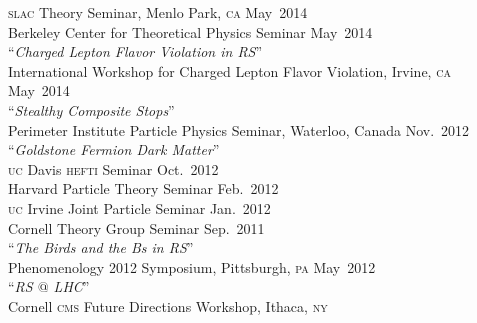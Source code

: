 \documentclass[margin,line]{resume}
\newcommand{\mytalksep}{-.1mm}
\newcommand{\mytalkskip}{2mm}
\newcommand{\scap}[1]{\textsc{\MakeLowercase{#1}}}
\begin{document}
\begin{resume}
%
\scap{SLAC} Theory Seminar, Menlo Park, \scap{CA}
\hfill %
May~2014\vspace{\mytalksep}\\   
%
Berkeley Center for Theoretical Physics Seminar%
\hfill %
May~2014\vspace{\mytalkskip}\\
%
%
%
``\emph{Charged Lepton Flavor Violation in RS}'' 
\vspace{\mytalksep}\\ 
International Workshop for Charged Lepton Flavor Violation, Irvine, \scap{CA}
\hfill %
May~2014\vspace{\mytalkskip}\\ 
%
%
%
``\emph{Stealthy Composite Stops}''
\vspace{\mytalksep}\\   
Perimeter Institute Particle Physics Seminar, Waterloo, Canada
\hfill %
Nov.~2012%
\vspace{\mytalkskip}\\
%
%
%
``\emph{Goldstone Fermion Dark Matter}''
\vspace{\mytalksep}\\   
\scap{UC} Davis \scap{HEFTI} Seminar
\hfill %
Oct.~2012\vspace{\mytalksep}\\   
%
Harvard Particle Theory Seminar%
\hfill %
Feb.~2012\vspace{\mytalksep}\\   
%
\scap{UC} Irvine Joint Particle Seminar
\hfill %
Jan.~2012\vspace{\mytalksep}\\   
%
Cornell Theory Group Seminar
\hfill %
Sep.~2011%
\vspace{\mytalkskip}\\
%
%
%
``\emph{The Birds and the Bs in RS}'' 
\vspace{\mytalksep}\\ 
Phenomenology 2012 Symposium, Pittsburgh, \scap{PA}
\hfill %
May~2012\vspace{\mytalkskip}\\ 
%
%
%
``\emph{RS $@$ LHC}'' 
\vspace{\mytalksep}\\ 
Cornell \scap{CMS} Future Directions Workshop, Ithaca, \scap{NY}

\end{resume}
\end{document}
